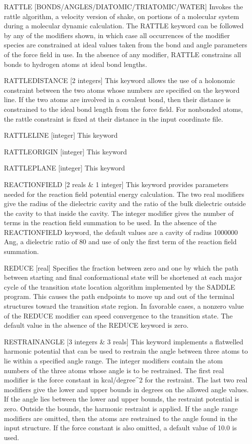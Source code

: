 \documentclass[letterpaper,11pt,english]{sphinxmanual}
\begin{document}
RATTLE {[}BONDS/ANGLES/DIATOMIC/TRIATOMIC/WATER{]}     Invokes the rattle algorithm, a velocity version of shake, on portions of a molecular system during a molecular dynamic calculation. The RATTLE keyword can be followed by any of the modifiers shown, in which case all occurrences of the modifier species are constrained at ideal values taken from the bond and angle parameters of the force field in use. In the absence of any modifier, RATTLE constrains all bonds to hydrogen atoms at ideal bond lengths.

RATTLE\sphinxhyphen{}DISTANCE {[}2 integers{]}     This keyword allows the use of a holonomic constraint between the two atoms whose numbers are specified on the keyword line. If the two atoms are involved in a covalent bond, then their distance is constrained to the ideal bond length from the force field. For nonbonded atoms, the rattle constraint is fixed at their distance in the input coordinate file.

RATTLE\sphinxhyphen{}LINE {[}integer{]}     This keyword

RATTLE\sphinxhyphen{}ORIGIN {[}integer{]}     This keyword

RATTLE\sphinxhyphen{}PLANE {[}integer{]}     This keyword

REACTIONFIELD {[}2 reals \& 1 integer{]}     This keyword provides parameters needed for the reaction field potential energy calculation. The two real modifiers give the radius of the dielectric cavity and the ratio of the bulk dielectric outside the cavity to that inside the cavity. The integer modifier gives the number of terms in the reaction field summation to be used. In the absence of the REACTIONFIELD keyword, the default values are a cavity of radius 1000000 Ang, a dielectric ratio of 80 and use of only the first term of the reaction field summation.

REDUCE {[}real{]}     Specifies the fraction between zero and one by which the path between starting and final conformational state will be shortened at each major cycle of the transition state location algorithm implemented by the SADDLE program. This causes the path endpoints to move up and out of the terminal structures toward the transition state region. In favorable cases, a nonzero value of the REDUCE modifier can speed convergence to the transition state. The default value in the absence of the REDUCE keyword is zero.

RESTRAIN\sphinxhyphen{}ANGLE {[}3 integers \& 3 reals{]}     This keyword implements a flat\sphinxhyphen{}welled harmonic potential that can be used to restrain the angle between three atoms to lie within a specified angle range. The integer modifiers contain the atom numbers of the three atoms whose angle is to be restrained.  The first real modifier is the force constant in kcal/degree\textasciicircum{}2 for the restraint. The last two real modifiers give the lower and upper bounds in degrees on the allowed angle values. If the angle lies between the lower and upper bounds, the restraint potential is zero. Outside the bounds, the harmonic restraint is applied. If the angle range modifiers are omitted, then the atoms are restrained to the angle found in the input structure. If the force constant is also omitted, a default value of 10.0 is used.
\end{document}
